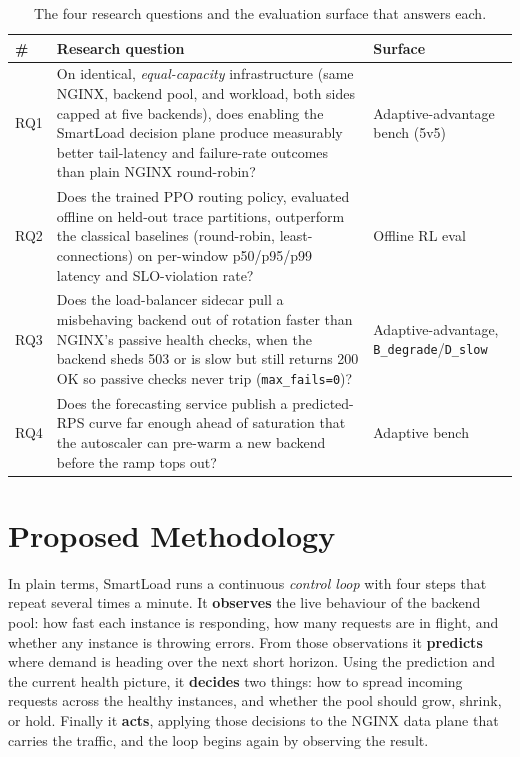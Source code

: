 \begin{table}[H]
  \centering
  \caption[The four research questions and their evaluation surfaces]{The four research questions and the evaluation surface that answers each.}
  \label{tab:intro:rqs}
  \small
  \begin{tabularx}{\linewidth}{@{}l Y l@{}}
    \toprule
    \headrow
    \textbf{\#} & \textbf{Research question} & \textbf{Surface} \\
    \midrule
    RQ1 & On identical, \emph{equal-capacity} infrastructure (same NGINX, backend pool, and workload, both sides capped at five backends), does enabling the SmartLoad decision plane produce measurably better tail-latency and failure-rate outcomes than plain NGINX round-robin? & Adaptive-advantage bench (5v5) \\
    \addlinespace
    RQ2 & Does the trained PPO routing policy, evaluated offline on held-out trace partitions, outperform the classical baselines (round-robin, least-connections) on per-window p50/p95/p99 latency and SLO-violation rate? & Offline RL eval \\
    \addlinespace
    RQ3 & Does the load-balancer sidecar pull a misbehaving backend out of rotation faster than NGINX's passive health checks, when the backend sheds 503 or is slow but still returns 200 OK so passive checks never trip (\texttt{max\_fails=0})? & Adaptive-advantage, \texttt{B\_degrade}/\texttt{D\_slow} \\
    \addlinespace
    RQ4 & Does the forecasting service publish a predicted-RPS curve far enough ahead of saturation that the autoscaler can pre-warm a new backend before the ramp tops out? & Adaptive bench \\
    \bottomrule
  \end{tabularx}
\end{table}

\section{Proposed Methodology}
\label{sec:intro:method}

In plain terms, SmartLoad runs a continuous \emph{control loop} with four steps
that repeat several times a minute. It \textbf{observes} the live behaviour of
the backend pool: how fast each instance is responding, how many requests are in
flight, and whether any instance is throwing errors. From those observations it
\textbf{predicts} where demand is heading over the next short horizon. Using the
prediction and the current health picture, it \textbf{decides} two things: how to
spread incoming requests across the healthy instances, and whether the pool
should grow, shrink, or hold. Finally it \textbf{acts}, applying those decisions
to the NGINX data plane that carries the traffic, and the loop begins again by
observing the result.

